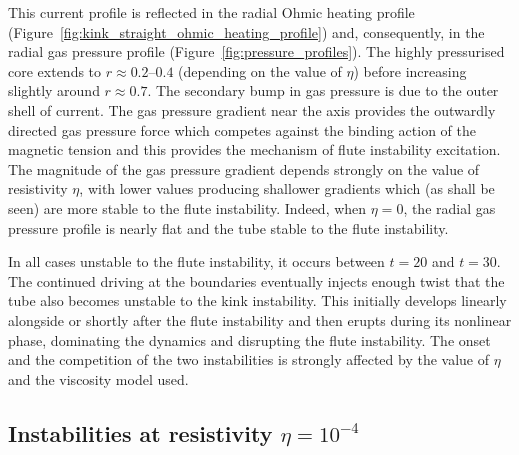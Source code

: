\documentclass[fleqn,usenatbib]{mnras}
\newcommand{\rev}[1]{{\color{red} {#1}}}
\begin{document}
This current profile is reflected in the radial Ohmic heating profile
(Figure~\ref{fig:kink_straight_ohmic_heating_profile}) and, consequently, in
the radial \rev{gas} pressure profile (Figure~\ref{fig:pressure_profiles}). The highly
pressurised core extends to $r\approx 0.2$--$0.4$ (depending on the value of
$\eta$) before increasing slightly around $r\approx 0.7$. The secondary bump in
\rev{gas} pressure is due to the outer shell of current. The \rev{gas}
pressure gradient near the
axis provides the outwardly directed \rev{gas} pressure force which competes against the
binding action of the magnetic tension and this provides the mechanism of flute
instability excitation.  The magnitude of the \rev{gas} pressure gradient depends
strongly on the value of resistivity $\eta$, with lower values producing
shallower gradients which (as shall be seen) are more stable to the flute
instability. Indeed, when $\eta=0$, the radial \rev{gas} pressure profile is nearly flat
and the tube stable to the flute instability.

In all cases unstable to the flute instability, it occurs  between $t=20$ and
$t=30$. The continued driving at the boundaries eventually injects enough twist
that the tube also becomes unstable to the kink instability. This initially
develops linearly alongside or shortly after the flute instability and then
\rev{erupts during its nonlinear phase}, dominating the dynamics and disrupting
the   flute instability. The onset and the competition of the two instabilities
is strongly affected by the value of $\eta$ and the viscosity model used. 

\subsection{Instabilities at resistivity $\eta=10^{-4}$}
\end{document}
